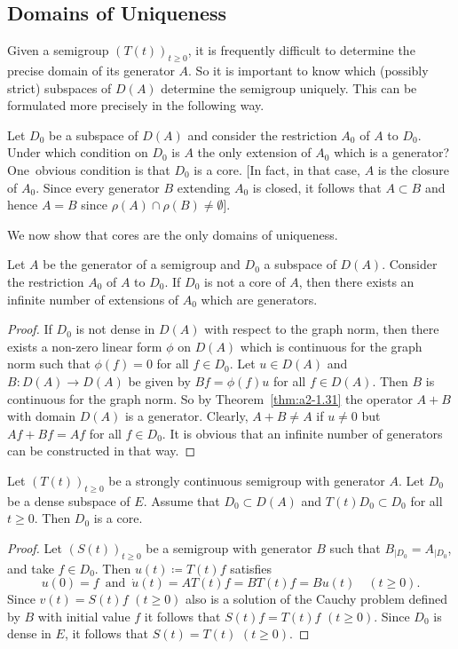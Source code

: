 \subsection{Domains of Uniqueness} \label{subsec:a2-1.se9}%
Given a semigroup $(T(t))_{t \geq 0}$,  
it is frequently difficult to determine the precise domain of its generator $A$.
So it is important to know which (possibly strict) subspaces of\/ $D(A)$ determine the semigroup uniquely.
This can be formulated more precisely in the following way.

Let $D_{0}$ be a subspace of\/ $D(A)$ and consider the restriction $A_{0}$ of\/ $A$ to $D_{0}$.
Under which condition on $D_{0}$ is $A$ the only extension of\/ $A_{0}$ which is a generator?
One~obvious condition is that $D_{0}$ is a core.
[In fact, in that case, $A$ is the closure of\/ $A_{0}$.
Since every generator $B$ extending $A_{0}$ is closed, it follows that $A \subset B$ and hence $A = B$ since 
$\rho(A) \cap \rho(B) \neq \emptyset$].

We now show that cores are the only domains of uniqueness.

\begin{theorem}\label{thm:a2-1.33}
Let $A$ be the generator of a semigroup and $D_{0}$ a subspace of\/ $D(A)$.
Consider the restriction $A_{0}$ of\/ $A$ to $D_{0}$.
If\/ $D_{0}$ is not a core of\/ $A$, then there exists an infinite number of extensions of\/ $A_{0}$ which are generators.
\end{theorem}
\begin{proof}
If\/ $D_{0}$ is not dense in $D(A)$ with respect to the graph norm, then there exists a non-zero linear form $\phi$ on $D(A)$ which is continuous for the graph norm such that $\phi(f) = 0$ for all $f \in D_{0}$. 
Let $u \in D(A)$ and $B \colon D(A) \to D(A)$ be given by $Bf = \phi(f)u$ for all $f \in D(A)$.
Then $B$ is continuous for the graph norm.
So by Theorem~\ref{thm:a2-1.31}   the operator $A+B$ with domain $D(A)$ is a generator.
Clearly, $A+B \neq A$ if\/ $u \neq 0$ but $Af+Bf = Af$ for all $f \in D_{0}$.
It is obvious that an infinite number of generators can be constructed in that way.
\end{proof}
\begin{corollary}\label{cor:a2-1.34}
Let $(T(t))_{t\geq 0}$ be a strongly continuous semigroup with generator $A$.
Let $D_{0}$ be a dense subspace of\/ $E$.
Assume that $D_{0} \subset D(A)$ and $T(t)D_{0} \subset D_{0}$ for all $t \geq 0$.
Then $D_{0}$ is a core.
\end{corollary}
\begin{proof}
Let $(S(t))_{t\geq 0}$ be a semigroup with generator $B$ such that $B_{\vert D_{0}} = A_{\vert D_{0}}$, and take $f \in D_{0}$.
Then $u(t) \coloneqq T(t)f$ satisfies 
\[
u(0) = f\,  \text{ and } \,\dot{u}(t) = AT(t)f = BT(t)f = Bu(t) \quad (t \geq 0).
\]
Since $v(t) = S(t)f$ $(t \geq 0)$ also is a solution of the Cauchy problem defined by $B$ with initial value $f$ it follows that $S(t)f = T(t)f$ $(t\geq 0)$.
Since $D_{0}$ is dense in $E$, it follows that $S(t) = T(t)$ $(t \geq 0)$.
\end{proof}
